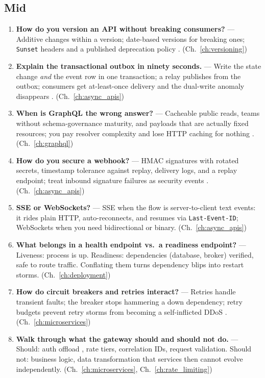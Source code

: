 \subsection*{Mid}

\begin{enumerate}[label=\textbf{Q\arabic*.}, leftmargin=3em, start=9]
  \item \textbf{How do you version an API without breaking consumers?} ---
        Additive changes within a version; date-based versions for breaking
        ones; \texttt{Sunset} headers and a published deprecation policy
        \cite{rfc8594}. (Ch.~\ref{ch:versioning})
  \item \textbf{Explain the transactional outbox in ninety seconds.} ---
        Write the state change \emph{and} the event row in one transaction;
        a relay publishes from the outbox; consumers get at-least-once
        delivery and the dual-write anomaly disappears
        \cite{kleppmann2017ddia}. (Ch.~\ref{ch:async_apis})
  \item \textbf{When is GraphQL the wrong answer?} --- Cacheable public
        reads, teams without schema-governance maturity, and payloads that
        are actually fixed resources; you pay resolver complexity and lose
        HTTP caching for nothing \cite{graphqlspec}.
        (Ch.~\ref{ch:graphql})
  \item \textbf{How do you secure a webhook?} --- HMAC signatures with
        rotated secrets, timestamp tolerance against replay, delivery logs,
        and a replay endpoint; treat inbound signature failures as security
        events \cite{owaspapisecurity}. (Ch.~\ref{ch:async_apis})
  \item \textbf{SSE or WebSockets?} --- SSE when the flow is server-to-client
        text events: it rides plain HTTP, auto-reconnects, and resumes via
        \texttt{Last-Event-ID}; WebSockets when you need bidirectional or
        binary. (Ch.~\ref{ch:async_apis})
  \item \textbf{What belongs in a health endpoint vs.\ a readiness
        endpoint?} --- Liveness: process is up. Readiness: dependencies
        (database, broker) verified, safe to route traffic. Conflating them
        turns dependency blips into restart storms.
        (Ch.~\ref{ch:deployment})
  \item \textbf{How do circuit breakers and retries interact?} --- Retries
        handle transient faults; the breaker stops hammering a down
        dependency; retry budgets prevent retry storms from becoming a
        self-inflicted DDoS \cite{nygard2018releaseit}.
        (Ch.~\ref{ch:microservices})
  \item \textbf{Walk through what the gateway should and should not do.} ---
        Should: auth offload \cite{rfc6749,rfc7519}, rate tiers, correlation
        IDs, request validation. Should not: business logic, data
        transformation that services then cannot evolve independently.
        (Ch.~\ref{ch:microservices}, Ch.~\ref{ch:rate_limiting})
\end{enumerate}

